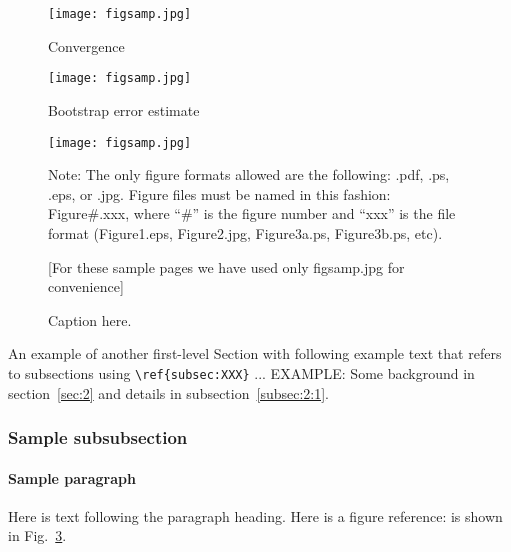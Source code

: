 \begin{figure}[ht]
\texttt{[image: figsamp.jpg]}
\caption{\label{fig:FIG6}{Convergence}}
\end{figure}

\begin{figure}[ht]
\texttt{[image: figsamp.jpg]}
\caption{\label{fig:FIG7}{Bootstrap error estimate}}
\end{figure}







\begin{figure}[ht]
\texttt{[image: figsamp.jpg]}
\caption{\label{fig:FIG1}{Caption here.}}

\raggedright
{\color{red}
Note: The only figure formats allowed are the following:
.pdf, .ps, .eps, or .jpg. Figure files must be named in this fashion:
Figure\#.xxx, where ``\#'' is the figure number and ``xxx'' is the file format
(Figure1.eps, Figure2.jpg, Figure3a.ps, Figure3b.ps, etc).
}

[For these sample pages we have used only figsamp.jpg for convenience]
\end{figure}


An example of another first-level Section with following example text that refers to subsections using
\verb+\ref{subsec:XXX}+ ...  EXAMPLE: Some background in
section~\ref{sec:2} and details  in subsection~\ref{subsec:2:1}.



   \subsubsection{Sample subsubsection\label{subsubsec:1}}

\paragraph{Sample paragraph}Here is text following the paragraph
heading.
Here is a figure reference: is shown in Fig.~\ref{fig:FIG1}.



